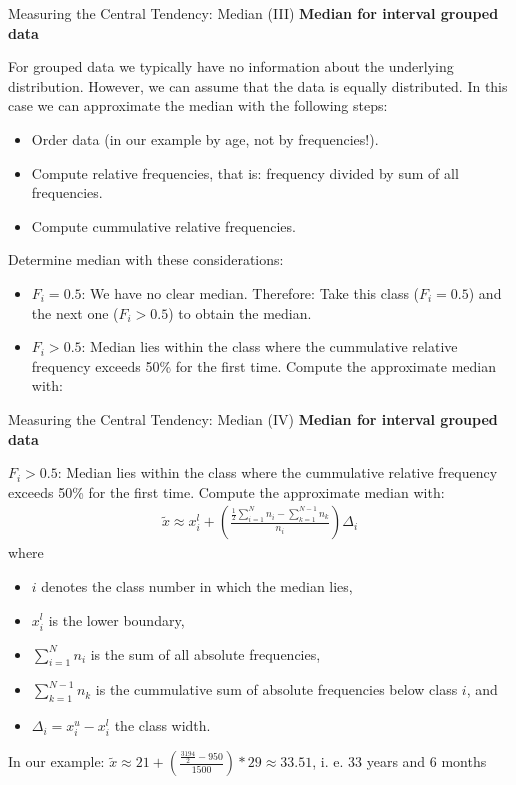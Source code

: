 \begin{frame}{Measuring the Central Tendency: Median (III)}
	\textbf{Median for interval grouped data}

	For grouped data we typically have no information about the underlying
	distribution. However, we can assume that the data is equally
	distributed. In this case we can approximate the median with the following
	steps:
	\begin{itemize}
		\item Order data (in our example by age, not by frequencies!).
		\item Compute relative frequencies, that is: frequency divided by sum of all frequencies.
		\item Compute cummulative relative frequencies.
	\end{itemize}

	Determine median with these considerations:
	\begin{itemize}
		\item $F_i=0.5$: We have no clear median. Therefore: Take this class ($F_i=0.5$) and the next one ($F_i > 0.5$) to obtain the median.
		\item $F_i>0.5$: Median lies within the class where the cummulative
		      relative frequency exceeds 50\% for the first time. Compute the approximate median with:
	\end{itemize}
\end{frame}

\begin{frame}{Measuring the Central Tendency: Median (IV)}
	\textbf{Median for interval grouped data}

	$F_i>0.5$: Median lies within the class where the cummulative
	relative frequency exceeds 50\% for the first time. Compute the approximate median with:
	\begin{align*}
		\tilde{x} \approx x_i^l +\left(\frac{\frac{1}{2}\sum_{i=1}^{N}n_i - \sum_{k=1}^{N-1} n_k}{n_i}\right)\Delta_i
	\end{align*}
	where
	\begin{itemize}
		\item $i$ denotes the class number in which the median lies,
		\item $x_i^l$ is the lower boundary,
		\item $\sum_{i=1}^{N}n_i$ is the sum of all absolute frequencies,
		\item $\sum_{k=1}^{N-1} n_k$ is the cummulative sum of absolute frequencies below class $i$, and
		\item $\Delta_i=x_i^u - x_i^l$ the class width.
	\end{itemize}

	In our example: $\tilde{x} \approx 21 +\left(\frac{\frac{3194}{2} - 950}{1500}\right)*29 \approx 33.51$, i. e. 33 years and 6 months
\end{frame}

